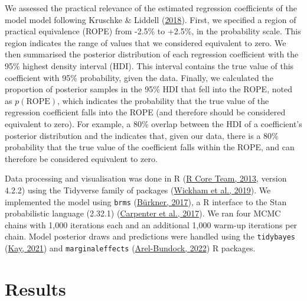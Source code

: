 \documentclass[
]{article}
\begin{document}
We assessed the practical relevance of the estimated regression
coefficients of the model model following Kruschke \& Liddell
(\protect\hyperlink{ref-kruschke2018bayesian}{2018}). First, we
specified a region of practical equivalence (ROPE) from -2.5\% to
+2.5\%, in the probability scale. This region indicates the range of
values that we considered equivalent to zero. We then summarised the
posterior distribution of each regression coefficient with the 95\%
highest density interval (HDI). This interval contains the true value of
this coefficient with 95\% probability, given the data. Finally, we
calculated the proportion of posterior samples in the 95\% HDI that fell
into the ROPE, noted as \(p(\text{ROPE})\), which indicates the
probability that the true value of the regression coefficient falls into
the ROPE (and therefore should be considered equivalent to zero). For
example, a 80\% overlap between the HDI of a coefficient's posterior
distribution and the indicates that, given our data, there is a 80\%
probability that the true value of the coefficient falls within the
ROPE, and can therefore be considered equivalent to zero.

Data processing and visualisation was done in R
(\protect\hyperlink{ref-rcoreteam2013language}{R Core Team, 2013},
version 4.2.2) using the Tidyverse family of packages
(\protect\hyperlink{ref-wickham2019welcome}{Wickham et al., 2019}). We
implemented the model using \texttt{brms}
(\protect\hyperlink{ref-burkner2017brms}{Bürkner, 2017}), a R interface
to the Stan probabilistic language (2.32.1)
(\protect\hyperlink{ref-carpenter2017stan}{Carpenter et al., 2017}). We
ran four MCMC chains with 1,000 iterations each and an additional 1,000
warm-up iterations per chain. Model posterior draws and predictions were
handled using the \texttt{tidybayes}
(\protect\hyperlink{ref-kay2021tidybayes}{Kay, 2021}) and
\texttt{marginaleffects}
(\protect\hyperlink{ref-arel-bundock2022marginaleffects}{Arel-Bundock,
2022}) R packages.

\hypertarget{sec-results}{%
\section{Results}\label{sec-results}}

\renewcommand{\arraystretch}{1.25}
\end{document}
